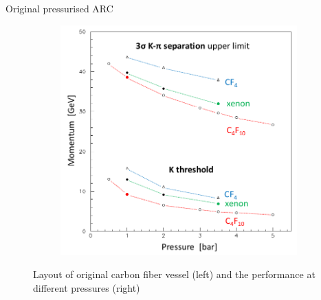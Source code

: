 \documentclass{beamer}
\begin{document}
\begin{frame}{Original pressurised ARC}
\begin{figure}
\begin{subfigure}{0.35\textwidth}
      \includegraphics[width = 1.0\textwidth]{Plots/Significance_vs_Pressure.png}
    \end{subfigure}
    \caption{Layout of original carbon fiber vessel (left) and the performance at different pressures (right)}
  \end{figure}
\end{frame}
\end{document}
